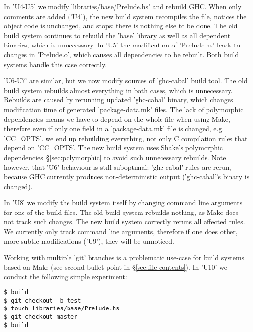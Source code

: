 
In \lst'U4-U5' we modify \lst'libraries/base/Prelude.hs' and rebuild GHC.
When only comments are added (\lst'U4'), the new build system recompiles the
file, notices the object code is unchanged, and stops: there is nothing else to
be done. The old build system continues to rebuild the \lst'base' library as
well as all dependent binaries, which is unnecessary. In \lst'U5' the
modification of \lst'Prelude.hs' leads to changes in \lst'Prelude.o', which
causes all dependencies to be rebuilt. Both build systems handle this case
correctly.

\lst'U6-U7' are similar, but we now modify sources of \lst'ghc-cabal' build
tool. The old build system rebuilds almost everything in both cases,
which is unnecessary. Rebuilds are caused by rerunning updated \lst'ghc-cabal'
binary, which changes modification time of generated \lst'package-data.mk'
files. The lack of polymorphic dependencies means we have to depend on the whole
file when using Make, therefore even if only one field in a
\lst'package-data.mk' file is changed, e.g. \lst'CC_OPTS', we end up
rebuilding everything, not only C compilation rules that depend on
\lst'CC_OPTS'. The new build system uses Shake's polymorphic
dependencies~\S\ref{sec:polymorphic} to avoid such unnecessary rebuilds. Note
however, that \lst'U6' behaviour is still suboptimal: \lst'ghc-cabal' rules
are rerun, because GHC currently produces non-deterministic output
(\lst'ghc-cabal''s binary is changed).

In \lst'U8' we modify the build system itself by changing command line
arguments for one of the build files. The old build system rebuilds nothing,
as Make does not track such changes. The new build system correctly reruns all
affected rules. We currently only track command line arguments, therefore if one
does other, more subtle modifications (\lst'U9'), they will be unnoticed.

Working with multiple \lst'git' branches is a problematic use-case for build
systems based on Make (see second bullet point in \S\ref{sec:file-contents}). In
\lst'U10' we conduct the following simple experiment:

\begin{lstlisting}
$ build
$ git checkout -b test
$ touch libraries/base/Prelude.hs
$ git checkout master
$ build
\end{lstlisting}

